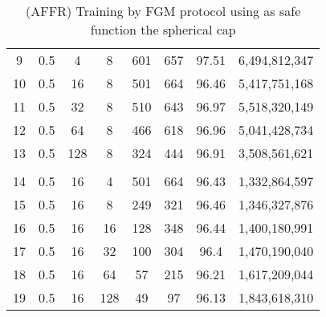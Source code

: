 \begin{table}[H]
\begin{tabular}{|c|c|c|c|c|c|c|c|}
        9                      & 0.5                   & 4                     & 8                     & 601                   & 657                   & 97.51                 & 6,494,812,347            \\
        10                     & 0.5                   & 16                    & 8                     & 501                   & 664                   & 96.46                 & 5,417,751,168            \\
        11                     & 0.5                   & 32                    & 8                     & 510                   & 643                   & 96.97                 & 5,518,320,149            \\
        12                     & 0.5                   & 64                    & 8                     & 466                   & 618                   & 96.96                 & 5,041,428,734            \\
        13                     & 0.5                   & 128                   & 8                     & 324                   & 444                   & 96.91                 & 3,508,561,621            \\
        \hline
        \multicolumn{1}{|l|}{} & \multicolumn{1}{l|}{} & \multicolumn{1}{l|}{} & \multicolumn{1}{l|}{} & \multicolumn{1}{l|}{} & \multicolumn{1}{l|}{} & \multicolumn{1}{l|}{} & \multicolumn{1}{l|}{}    \\
        \hline
        14                     & 0.5                   & 16                    & 4                     & 501                   & 664                   & 96.43                 & 1,332,864,597            \\
        15                     & 0.5                   & 16                    & 8                     & 249                   & 321                   & 96.46                 & 1,346,327,876            \\
        16                     & 0.5                   & 16                    & 16                    & 128                   & 348                   & 96.44                 & 1,400,180,991            \\
        17                     & 0.5                   & 16                    & 32                    & 100                   & 304                   & 96.4                  & 1,470,190,040            \\
        18                     & 0.5                   & 16                    & 64                    & 57                    & 215                   & 96.21                 & 1,617,209,044            \\
        19                     & 0.5                   & 16                    & 128                   & 49                    & 97                    & 96.13                 & 1,843,618,310            \\
        \hline
    \end{tabular}
    \caption{(AFFR) Training by FGM protocol using as safe function the spherical cap}
    \label{tab:table-fgm-sf2-nlp-exp}
\end{table}
